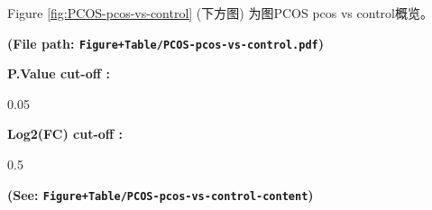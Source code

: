 \documentclass[
]{article}
\begin{document}
Figure \ref{fig:PCOS-pcos-vs-control} (下方图) 为图PCOS pcos vs control概览。

\textbf{(File path: \texttt{Figure+Table/PCOS-pcos-vs-control.pdf})}

\begin{center}\vspace{1.5cm}\end{center}\begin{center}\begin{tcolorbox}[colback=gray!10, colframe=gray!50, width=0.9\linewidth, arc=1mm, boxrule=0.5pt]
\textbf{
P.Value cut-off
:}

\vspace{0.5em}

    0.05

\vspace{2em}


\textbf{
Log2(FC) cut-off
:}

\vspace{0.5em}

    0.5

\vspace{2em}
\end{tcolorbox}
\end{center}

\textbf{(See: \texttt{Figure+Table/PCOS-pcos-vs-control-content})}

\begin{center}\vspace{1.5cm}\end{center}
\end{document}
